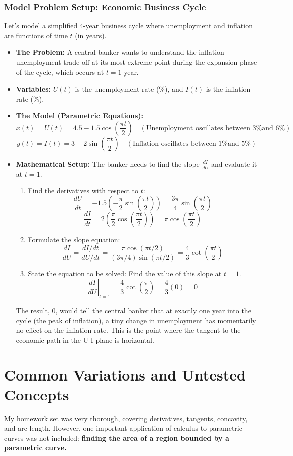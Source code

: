 \documentclass{article}
\begin{document}
\section{Model Problem Setup: Economic Business Cycle}
Let's model a simplified 4-year business cycle where unemployment and inflation are functions of time $t$ (in years).
\begin{itemize}
    \item \textbf{The Problem:} A central banker wants to understand the inflation-unemployment trade-off at its most extreme point during the expansion phase of the cycle, which occurs at $t=1$ year.
    \item \textbf{Variables:} $U(t)$ is the unemployment rate (\%), and $I(t)$ is the inflation rate (\%).
    \item \textbf{The Model (Parametric Equations):}
        \[ x(t) = U(t) = 4.5 - 1.5\cos(\frac{\pi t}{2}) \quad (\text{Unemployment oscillates between 3\% and 6\%}) \]
        \[ y(t) = I(t) = 3 + 2\sin(\frac{\pi t}{2}) \quad (\text{Inflation oscillates between 1\% and 5\%}) \]
    \item \textbf{Mathematical Setup:} The banker needs to find the slope $\frac{dI}{dU}$ and evaluate it at $t=1$.
    \begin{enumerate}
        \item Find the derivatives with respect to $t$:
            \[ \frac{dU}{dt} = -1.5 \left(-\frac{\pi}{2}\sin(\frac{\pi t}{2})\right) = \frac{3\pi}{4}\sin(\frac{\pi t}{2}) \]
            \[ \frac{dI}{dt} = 2 \left(\frac{\pi}{2}\cos(\frac{\pi t}{2})\right) = \pi\cos(\frac{\pi t}{2}) \]
        \item Formulate the slope equation:
            \[ \frac{dI}{dU} = \frac{dI/dt}{dU/dt} = \frac{\pi\cos(\pi t/2)}{(3\pi/4)\sin(\pi t/2)} = \frac{4}{3}\cot(\frac{\pi t}{2}) \]
        \item State the equation to be solved: Find the value of this slope at $t=1$.
            \[ \left.\frac{dI}{dU}\right|_{t=1} = \frac{4}{3}\cot(\frac{\pi}{2}) = \frac{4}{3}(0) = 0 \]
    \end{enumerate}
    The result, 0, would tell the central banker that at exactly one year into the cycle (the peak of inflation), a tiny change in unemployment has momentarily no effect on the inflation rate. This is the point where the tangent to the economic path in the U-I plane is horizontal.
\end{itemize}

\part{Common Variations and Untested Concepts}
My homework set was very thorough, covering derivatives, tangents, concavity, and arc length. However, one important application of calculus to parametric curves was not included: \textbf{finding the area of a region bounded by a parametric curve.}
\end{document}
